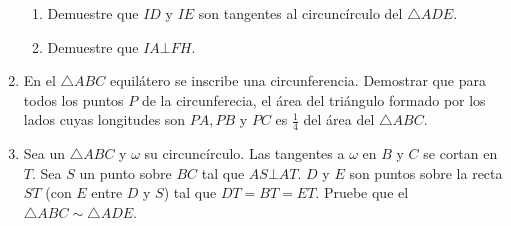 \documentclass{book}
\begin{document}
\begin{enumerate}
\begin{enumerate}
 					\item Demuestre que $ID$ y $IE$ son tangentes al circuncírculo del $\triangle ADE$. 
 					\item Demuestre que $IA \bot FH$.
 				\end{enumerate}
 			\item En el $\triangle ABC$ equilátero se inscribe una circunferencia. Demostrar que para todos los puntos $P$ de la circunferecia, el área del triángulo formado por los lados cuyas longitudes son $PA, PB$ y $PC$ es $\displaystyle{\frac{1}{4}}$ del área del $\triangle ABC$. 
 			\item Sea un $\triangle ABC$ y $\omega$ su circuncírculo. Las tangentes a $\omega$ en $B$ y $C$ se cortan en $T$. Sea $S$ un punto sobre $BC$ tal que $AS \bot AT$. $D$ y $E$ son puntos sobre la recta $ST$ (con $E$ entre $D$ y $S$) tal que $DT = BT =ET$. Pruebe que el $\triangle ABC\sim\triangle ADE$. 
		\end{enumerate}
		\newpage
\end{document}
